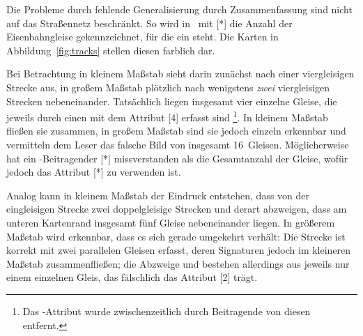 \documentclass[../main/thesis.tex]{subfiles}
\begin{document}
\label{railway-case}

Die Probleme durch fehlende Generalisierung durch Zusammenfassung sind nicht auf das Straßennetz beschränkt.
So wird in \osm\ mit [*] die Anzahl der Eisenbahngleise gekennzeichnet, für die ein  steht.
Die Karten in Abbildung~\ref{fig:tracks} stellen diesen  farblich dar.

Bei Betrachtung in kleinem Maßstab sieht darin  zunächst nach einer viergleisigen Strecke aus, in großem Maßstab plötzlich nach wenigstens \emph{zwei} viergleisigen Strecken nebeneinander.
Tatsächlich liegen insgesamt vier einzelne Gleise, die jeweils durch einen  mit dem Attribut [4] erfasst sind%
\footnote{Das -Attribut wurde zwischenzeitlich durch Beitragende von diesen  entfernt.}.
In kleinem Maßstab fließen sie zusammen, in großem Maßstab sind sie jedoch einzeln erkennbar und vermitteln dem Leser das falsche Bild von insgesamt 16~Gleisen.
Möglicherweise hat ein \osm-Beitragender [*] missverstanden als die Gesamtanzahl der Gleise,  wofür jedoch das Attribut [*] zu verwenden ist.


Analog kann in kleinem Maßstab der Eindruck entstehen, dass von der eingleisigen Strecke  zwei doppelgleisige Strecken  und  derart abzweigen, dass am unteren Kartenrand insgesamt fünf Gleise nebeneinander liegen.
In größerem Maßstab wird erkennbar, dass es sich gerade umgekehrt verhält:
Die Strecke  ist korrekt mit zwei parallelen Gleisen erfasst, deren Signaturen jedoch im kleineren Maßstab zusammenfließen;
die Abzweige  und  bestehen allerdings aus jeweils nur einem einzelnen Gleis, das fälschlich das Attribut [2] trägt.
\end{document}
